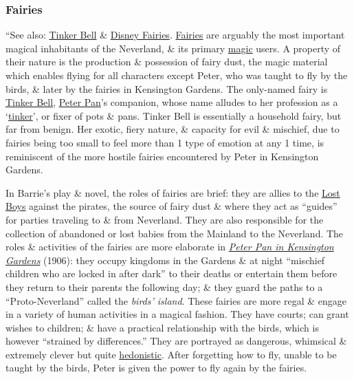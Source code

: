 \documentclass[oneside]{book}
\numberwithin{equation}{section}
\begin{document}
\subsubsection{Fairies}
``See also: \href{https://en.wikipedia.org/wiki/Tinker_Bell}{Tinker Bell} \& \href{https://en.wikipedia.org/wiki/Disney_Fairies}{Disney Fairies}. \href{https://en.wikipedia.org/wiki/Fairy}{Fairies} are arguably the most important magical inhabitants of the Neverland, \& its primary \href{https://en.wikipedia.org/wiki/Magic_(paranormal)}{magic} users. A property of their nature is the production \& possession of fairy dust, the magic material which enables flying for all characters except Peter, who was taught to fly by the birds, \& later by the fairies in Kensington Gardens. The only-named fairy is \href{https://en.wikipedia.org/wiki/Tinker_Bell}{Tinker Bell}, \href{https://en.wikipedia.org/wiki/Peter_Pan}{Peter Pan}'s companion, whose name alludes to her profession as a `\href{https://en.wikipedia.org/wiki/Tinker}{tinker}', or fixer of pots \& pans. Tinker Bell is essentially a household fairy, but far from benign. Her exotic, fiery nature, \& capacity for evil \& mischief, due to fairies being too small to feel more than 1 type of emotion at any 1 time, is reminiscent of the more hostile fairies encountered by Peter in Kensington Gardens.

In Barrie's play \& novel, the roles of fairies are brief: they are allies to the \href{https://en.wikipedia.org/wiki/Lost_Boys_(Peter_Pan)}{Lost Boys} against the pirates, the source of fairy dust \& where they act as ``guides'' for parties traveling to \& from Neverland. They are also responsible for the collection of abandoned or lost babies from the Mainland to the Neverland. The roles \& activities of the fairies are more elaborate in \href{https://en.wikipedia.org/wiki/Peter_Pan_in_Kensington_Gardens}{\textit{Peter Pan in Kensington Gardens}} (1906): they occupy kingdoms in the Gardens \& at night ``mischief children who are locked in after dark'' to their deaths or entertain them before they return to their parents the following day; \& they guard the paths to a ``Proto-Neverland'' called the \textit{birds' island}. These fairies are more regal \& engage in a variety of human activities in a magical fashion. They have courts; can grant wishes to children; \& have a practical relationship with the birds, which is however ``strained by differences.'' They are portrayed as dangerous, whimsical \& extremely clever but quite \href{https://en.wikipedia.org/wiki/Hedonism}{hedonistic}. After forgetting how to fly, unable to be taught by the birds, Peter is given the power to fly again by the fairies.
\end{document}
